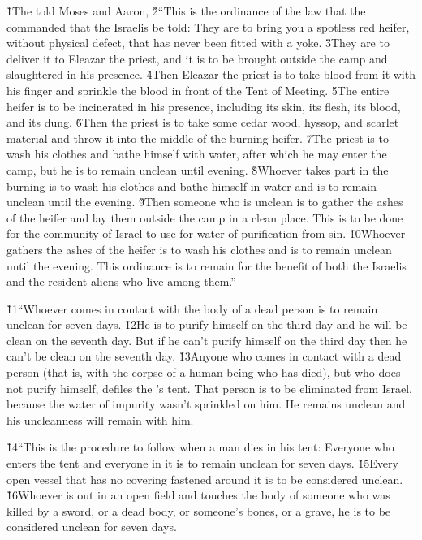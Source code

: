 \v{1}The  told Moses and Aaron, \v{2}``This is the ordinance of the law that the  commanded that the Israelis be told: They are to bring you a spotless red heifer, without physical defect, that has never been fitted with a yoke. \v{3}They are to deliver it to Eleazar the priest, and it is to be brought outside the camp and slaughtered in his presence. \v{4}Then Eleazar the priest is to take blood from it with his finger and sprinkle the blood in front of the Tent of Meeting. \v{5}The entire heifer is to be incinerated in his presence, including its skin, its flesh, its blood, and its dung. \v{6}Then the priest is to take some cedar wood, hyssop, and scarlet material and throw it into the middle of the burning heifer. \v{7}The priest is to wash his clothes and bathe himself with water, after which he may enter the camp, but he is to remain unclean until evening. \v{8}Whoever takes part in the burning is to wash his clothes and bathe himself in water and is to remain unclean until the evening. \v{9}Then someone who is unclean is to gather the ashes of the heifer and lay them outside the camp in a clean place. This is to be done for the community of Israel to use for water of purification from sin. \v{10}Whoever gathers the ashes of the heifer is to wash his clothes and is to remain unclean until the evening. This ordinance is to remain for the benefit of both the Israelis and the resident aliens who live among them.''

\v{11}``Whoever comes in contact with the body of a dead person is to remain unclean for seven days. \v{12}He is to purify himself on the third day and he will be clean on the seventh day. But if he can't purify himself on the third day then he can't be clean on the seventh day. \v{13}Anyone who comes in contact with a dead person (that is, with the corpse of a human being who has died), but who does not purify himself, defiles the 's tent. That person is to be eliminated from Israel, because the water of impurity wasn't sprinkled on him. He remains unclean and his uncleanness will remain with him.

\v{14}``This is the procedure to follow when a man dies in his tent: Everyone who enters the tent and everyone in it is to remain unclean for seven days. \v{15}Every open vessel that has no covering fastened around it is to be considered unclean. \v{16}Whoever is out in an open field and touches the body of someone who was killed by a sword, or a dead body, or someone's bones, or a grave, he is to be considered unclean for seven days.

